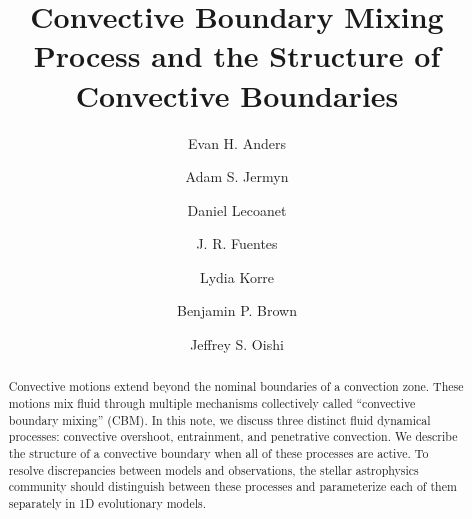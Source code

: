 \documentclass[linenumbers]{aastex631}
\begin{document}
\title{Convective Boundary Mixing Process and the Structure of Convective Boundaries}
\author[0000-0002-3433-4733]{Evan H. Anders}
\author[0000-0001-5048-9973]{Adam S. Jermyn}
\author[0000-0002-7635-9728]{Daniel Lecoanet}
\author[0000-0003-2124-9764]{J. R. Fuentes}
\author[0000-0002-0963-4881]{Lydia Korre}
\author[0000-0001-8935-219X]{Benjamin P. Brown}
\author[0000-0001-8531-6570]{Jeffrey S. Oishi}


\begin{abstract}
    Convective motions extend beyond the nominal boundaries of a convection zone.
    These motions mix fluid through multiple mechanisms collectively called ``convective boundary mixing'' (CBM).
    In this note, we discuss three distinct fluid dynamical processes: convective overshoot, entrainment, and penetrative convection.
    We describe the structure of a convective boundary when all of these processes are active.
    To resolve discrepancies between models and observations, the stellar astrophysics community should distinguish between these processes and parameterize each of them separately in 1D evolutionary models.
\end{abstract}










\end{document}
